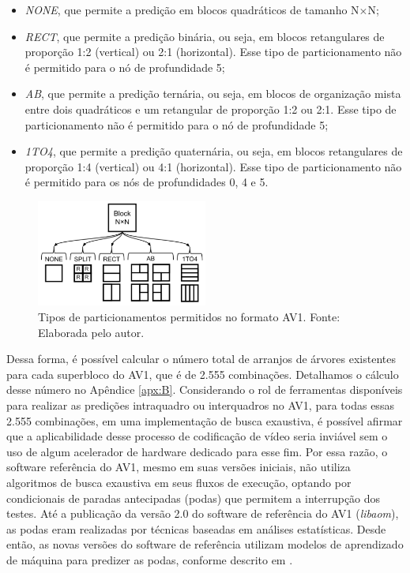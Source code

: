 \begin{itemize}
    \item \textit{NONE}, que permite a predição em blocos quadráticos de tamanho N$\times$N;
    
    \item \textit{RECT}, que permite a predição binária, ou seja, em blocos retangulares de proporção 1:2 (vertical) ou 2:1 (horizontal). Esse tipo de particionamento não é permitido para o nó de profundidade 5;

    \item \textit{AB}, que permite a predição ternária, ou seja, em blocos de organização mista entre dois quadráticos e um retangular de proporção 1:2 ou 2:1. Esse tipo de particionamento não é permitido para o nó de profundidade 5;

    \item \textit{1TO4}, que permite a predição quaternária, ou seja, em blocos retangulares de proporção 1:4 (vertical) ou 4:1 (horizontal). Esse tipo de particionamento não é permitido para os nós de profundidades 0, 4 e 5.
\end{itemize}

\begin{figure}
    \centering
    \includegraphics[width=0.5\textwidth]{FIGURES/fig_14.png}
    \caption{Tipos de particionamentos permitidos no formato AV1. Fonte: Elaborada pelo autor.}
    \label{fig:14}
\end{figure}

Dessa forma, é possível calcular o número total de arranjos de árvores existentes para cada superbloco do AV1, que é de 2.555 combinações. Detalhamos o cálculo desse número no Apêndice \ref{apx:B}. Considerando o rol de ferramentas disponíveis para realizar as predições intraquadro ou interquadros no AV1, para todas essas 2.555 combinações, em uma implementação de busca exaustiva, é possível afirmar que a aplicabilidade desse processo de codificação de vídeo seria inviável sem o uso de algum acelerador de hardware dedicado para esse fim. Por essa razão, o software referência do AV1, mesmo em suas versões iniciais, não utiliza algoritmos de busca exaustiva em seus fluxos de execução, optando por condicionais de paradas antecipadas (podas) que permitem a interrupção dos testes. Até a publicação da versão 2.0 do software de referência do AV1 (\textit{libaom}), as podas eram realizadas por técnicas baseadas em análises estatísticas. Desde então, as novas versões do software de referência utilizam modelos de aprendizado de máquina para predizer as podas, conforme descrito em \citet{bib:av1_ml_partitioning}.


